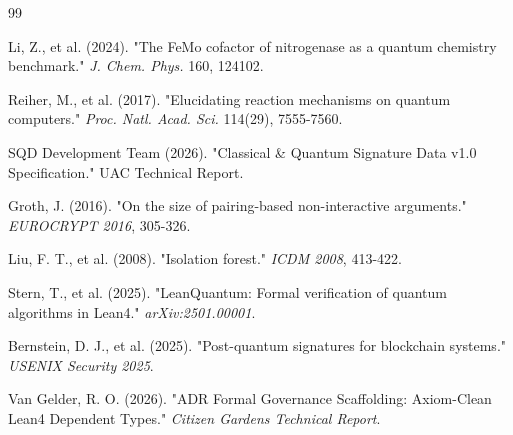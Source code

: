 \documentclass[11pt,a4paper]{article}
\begin{document}

\begin{thebibliography}{99}

Li, Z., et al. (2024). "The FeMo cofactor of nitrogenase as a quantum chemistry benchmark." \textit{J. Chem. Phys.} 160, 124102.

Reiher, M., et al. (2017). "Elucidating reaction mechanisms on quantum computers." \textit{Proc. Natl. Acad. Sci.} 114(29), 7555-7560.

SQD Development Team (2026). "Classical \& Quantum Signature Data v1.0 Specification." UAC Technical Report.

Groth, J. (2016). "On the size of pairing-based non-interactive arguments." \textit{EUROCRYPT 2016}, 305-326.

Liu, F. T., et al. (2008). "Isolation forest." \textit{ICDM 2008}, 413-422.

Stern, T., et al. (2025). "LeanQuantum: Formal verification of quantum algorithms in Lean4." \textit{arXiv:2501.00001}.

Bernstein, D. J., et al. (2025). "Post-quantum signatures for blockchain systems." \textit{USENIX Security 2025}.

Van Gelder, R. O. (2026). "ADR Formal Governance Scaffolding: Axiom-Clean Lean4 Dependent Types." \textit{Citizen Gardens Technical Report}.

\end{thebibliography}
\end{document}
